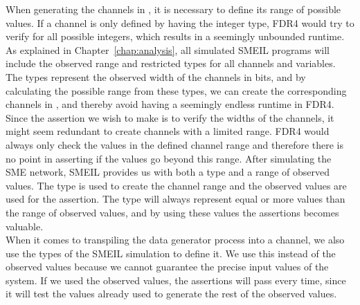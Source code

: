 When generating the channels in \cspm{}, it is necessary to define its range of possible values. If a channel is only defined by having the integer type, FDR4 would try to verify for all possible integers, which results in a seemingly unbounded runtime. As explained in Chapter~\ref{chap:analysis}, all simulated SMEIL programs will include the observed range and restricted types for all channels and variables. The types represent the observed width of the channels in bits, and by calculating the possible range from these types, we can create the corresponding channels in \cspm{}, and thereby avoid having a seemingly endless runtime in FDR4.\\

Since the assertion we wish to make is to verify the widths of the channels, it might seem redundant to create \cspm{} channels with a limited range. FDR4 would always only check the values in the defined channel range and therefore there is no point in asserting if the values go beyond this range. After simulating the SME network, SMEIL provides us with both a type and a range of observed values. The type is used to create the \cspm{} channel range and the observed values are used for the assertion. The type will always represent equal or more values than the range of observed values, and by using these values the assertions becomes valuable.
\\

When it comes to transpiling the data generator process into a \cspm{} channel, we also use the types of the SMEIL simulation to define it. We use this instead of the observed values because we cannot guarantee the precise input values of the system. If we used the observed values, the assertions will pass every time, since it will test the values already used to generate the rest of the observed values.

%




